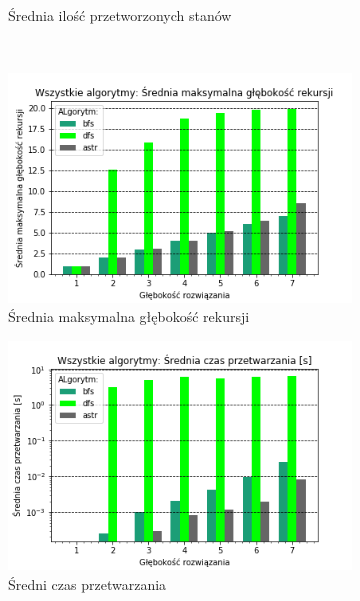 \documentclass{classrep}
\begin{document}
\begin{figure}[H]
\begin{subfigure}[t]{0.45\textwidth}
        \caption{Średnia ilość przetworzonych stanów}
        \label{ALL:processed}
    \end{subfigure}
    \qquad
    ~ %
    \begin{subfigure}[t]{0.45\textwidth}
        \includegraphics[width=\textwidth]{charts/ALL_recursed.png}
        \caption{Średnia maksymalna głębokość rekursji}
        \label{ALL:rescursed}
    \end{subfigure}
    \begin{subfigure}[t]{0.45\textwidth}
        \includegraphics[width=\textwidth]{charts/ALL_time.png}
        \caption{Średni czas przetwarzania}
        \label{ALL:time}
    \end{subfigure}
    \begin{subfigure}[t]{0.45\textwidth}

\end{subfigure}
\end{figure}
\end{document}
